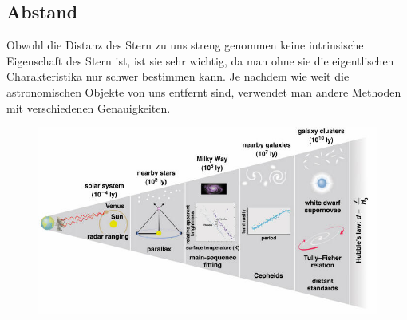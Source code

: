 \documentclass[final]{summery_5.0}
\begin{document}
\subsection{Abstand}
Obwohl die Distanz des Stern zu uns streng genommen keine intrinsische Eigenschaft des Stern ist, ist sie sehr wichtig, da man ohne sie die eigentlischen Charakteristika nur schwer bestimmen kann. Je nachdem wie weit die astronomischen Objekte von uns entfernt sind, verwendet man andere Methoden mit verschiedenen Genauigkeiten.
\begin{figure}[H]
    \centering
    \includegraphics[width=.5\textwidth]{distanz_messungen.jpg}
\end{figure}
\end{document}
